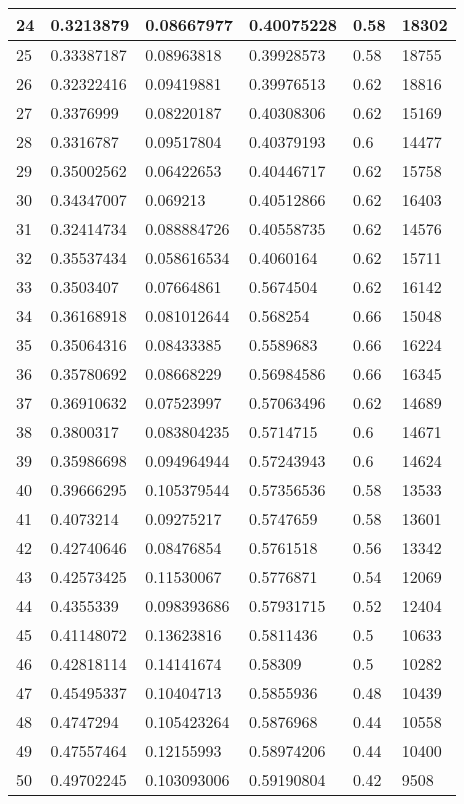 \begin{longtable}{|l|l|l|l|l|l|}
24 & 0.3213879 & 0.08667977 & 0.40075228 & 0.58 & 18302 \\ \hline 
25 & 0.33387187 & 0.08963818 & 0.39928573 & 0.58 & 18755 \\ \hline 
26 & 0.32322416 & 0.09419881 & 0.39976513 & 0.62 & 18816 \\ \hline 
27 & 0.3376999 & 0.08220187 & 0.40308306 & 0.62 & 15169 \\ \hline 
28 & 0.3316787 & 0.09517804 & 0.40379193 & 0.6 & 14477 \\ \hline 
29 & 0.35002562 & 0.06422653 & 0.40446717 & 0.62 & 15758 \\ \hline 
30 & 0.34347007 & 0.069213 & 0.40512866 & 0.62 & 16403 \\ \hline 
31 & 0.32414734 & 0.088884726 & 0.40558735 & 0.62 & 14576 \\ \hline 
32 & 0.35537434 & 0.058616534 & 0.4060164 & 0.62 & 15711 \\ \hline 
33 & 0.3503407 & 0.07664861 & 0.5674504 & 0.62 & 16142 \\ \hline 
34 & 0.36168918 & 0.081012644 & 0.568254 & 0.66 & 15048 \\ \hline 
35 & 0.35064316 & 0.08433385 & 0.5589683 & 0.66 & 16224 \\ \hline 
36 & 0.35780692 & 0.08668229 & 0.56984586 & 0.66 & 16345 \\ \hline 
37 & 0.36910632 & 0.07523997 & 0.57063496 & 0.62 & 14689 \\ \hline 
38 & 0.3800317 & 0.083804235 & 0.5714715 & 0.6 & 14671 \\ \hline 
39 & 0.35986698 & 0.094964944 & 0.57243943 & 0.6 & 14624 \\ \hline 
40 & 0.39666295 & 0.105379544 & 0.57356536 & 0.58 & 13533 \\ \hline 
41 & 0.4073214 & 0.09275217 & 0.5747659 & 0.58 & 13601 \\ \hline 
42 & 0.42740646 & 0.08476854 & 0.5761518 & 0.56 & 13342 \\ \hline 
43 & 0.42573425 & 0.11530067 & 0.5776871 & 0.54 & 12069 \\ \hline 
44 & 0.4355339 & 0.098393686 & 0.57931715 & 0.52 & 12404 \\ \hline 
45 & 0.41148072 & 0.13623816 & 0.5811436 & 0.5 & 10633 \\ \hline 
46 & 0.42818114 & 0.14141674 & 0.58309 & 0.5 & 10282 \\ \hline 
47 & 0.45495337 & 0.10404713 & 0.5855936 & 0.48 & 10439 \\ \hline 
48 & 0.4747294 & 0.105423264 & 0.5876968 & 0.44 & 10558 \\ \hline 
49 & 0.47557464 & 0.12155993 & 0.58974206 & 0.44 & 10400 \\ \hline 
50 & 0.49702245 & 0.103093006 & 0.59190804 & 0.42 & 9508 \\ \hline 
\end{longtable}